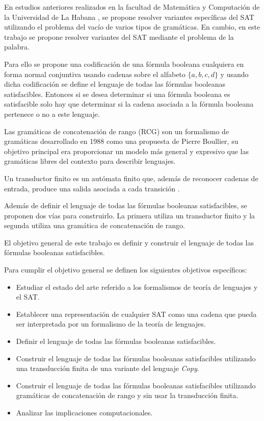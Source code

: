 \documentclass[12pt]{article}
\begin{document}
En estudios anteriores realizados en la facultad de Matemática y Computación de la Universidad de La Habana \cite{aCFSAT,aSRCSAT}, 
se propone resolver variantes específicas del SAT utilizando el problema del vacío de varios tipos de 
gramáticas. En cambio, en este trabajo se propone resolver variantes del SAT mediante el problema de la 
palabra. 

Para ello se propone una codificación de una fórmula booleana cualquiera en forma normal conjuntiva usando 
cadenas sobre el alfabeto $\{a,b,c,d\}$ y usando dicha codificación se define el lenguaje de todas las fórmulas 
booleanas satisfacibles. Entonces si se desea determinar si una fórmula booleana es satisfacible 
solo hay que determinar si la cadena asociada a la fórmula booleana pertenece o no a este lenguaje.

Las gramáticas de concatenación de rango (RCG) \cite{mainRCGBib} son un formalismo de
gramáticas desarrollado en 1988 como una propuesta de Pierre Boullier, su objetivo principal era
proporcionar un modelo más general y expresivo que las gramáticas libres del contexto para describir lenguajes.

Un transductor finito es un autómata finito que, además de reconocer cadenas de entrada, produce una salida asociada a cada transición \cite{finite_transducer}.

Además de definir el lenguaje de todas las fórmulas booleanas satisfacibles, se proponen dos vías para 
construirlo. La primera utiliza un transductor finito y la segunda utiliza una gramática de concatenación de rango.

El objetivo general de este trabajo es definir y construir el lenguaje de todas las fórmulas booleanas satisfacibles.

Para cumplir el objetivo general se definen los siguientes objetivos específicos:

\begin{itemize}
      \item Estudiar el estado del arte referido a los formalismos de teoría de lenguajes y el SAT.
      \item Establecer una representación de cualquier SAT como una cadena que pueda ser interpretada por un formalismo de la teoría de lenguajes.
      \item Definir el lenguaje de todas las fórmulas booleanas satisfacibles.
      \item Construir el lenguaje de todas las fórmulas booleanas satisfacibles utilizando una transducción finita de una variante del lenguaje \textit{Copy}.
      \item Construir el lenguaje de todas las fórmulas booleanas satisfacibles  utilizando gramáticas de concatenación de rango y sin usar la transducción finita.
      \item Analizar las implicaciones computacionales.
\end{itemize}
\end{document}
